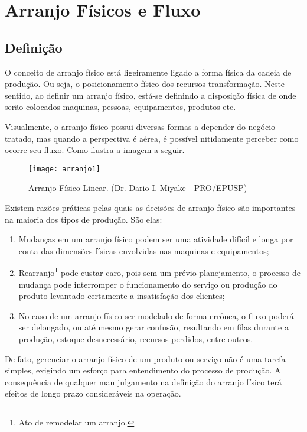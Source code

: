 \chapter[Arranjo Físicos e Fluxo]{Arranjo Físicos e Fluxo}
\label{chap:arranjo}

	\section[Definição]{Definição}
	\label{sec:arranjo_definicao}

		O conceito de arranjo físico está ligeiramente ligado a forma física da cadeia de produção. Ou seja, o posicionamento físico dos recursos transformação. Neste sentido, ao definir um arranjo físico, está-se definindo a disposição física de onde serão colocados maquinas, pessoas, equipamentos, produtos etc.

		Visualmente, o arranjo físico possui diversas formas a depender do negócio tratado, mas quando a perspectiva é aérea, é possível nitidamente perceber como ocorre seu fluxo. Como ilustra a imagem a seguir.

		\begin{figure}[h]
			\centering
			\texttt{[image: arranjo1]}
			\caption[Arranjo Físico Linear]{Arranjo Físico Linear. (Dr. Dario I. Miyake - PRO/EPUSP)}
			\label{fig:arranjo1}
		\end{figure}

		Existem razões práticas pelas quais as decisões de arranjo físico são importantes na maioria dos tipos de produção. São elas:

		\begin{enumerate}
			\item{Mudanças em um arranjo físico podem ser uma atividade difícil e longa por conta das dimensões físicas envolvidas nas maquinas e equipamentos;}
			\item{Rearranjo\footnote{Ato de remodelar um arranjo.} pode custar caro, pois sem um prévio planejamento, o processo de mudança pode interromper o funcionamento do serviço ou produção do produto levantado certamente a insatisfação dos clientes;}
			\item{No caso de um arranjo físico ser modelado de forma errônea, o fluxo poderá ser delongado, ou até mesmo gerar confusão, resultando em filas durante a produção, estoque desnecessário, recursos perdidos, entre outros.}
		\end{enumerate}

		De fato, gerenciar o arranjo físico de um produto ou serviço não é uma tarefa simples, exigindo um esforço para entendimento do processo de produção. A consequência de qualquer mau julgamento na definição do arranjo físico terá efeitos de longo prazo consideráveis na operação.

